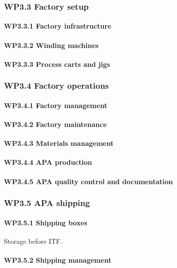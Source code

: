 \subsubsection{WP3.3 Factory setup}
\paragraph{WP3.3.1 Factory infrastructure}
\paragraph{WP3.3.2 Winding machines}
\paragraph{WP3.3.3 Process carts and jigs}

\subsubsection{WP3.4 Factory operations}
\paragraph{WP3.4.1 Factory management}
\paragraph{WP3.4.2 Factory maintenance}
\paragraph{WP3.4.3 Materials management}
\paragraph{WP3.4.4 APA production}
\paragraph{WP3.4.5 APA quality control and documentation}

\subsubsection{WP3.5 APA shipping}
\paragraph{WP3.5.1 Shipping boxes}
Storage before ITF.


\paragraph{WP3.5.2 Shipping management}

